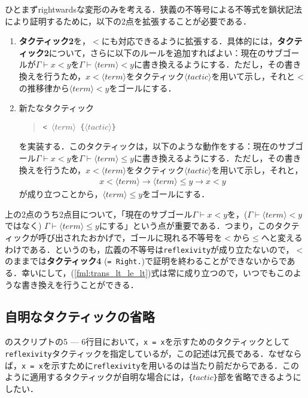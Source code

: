 \documentclass[submit]{ipsj}
\begin{document}
ひとまずrightwardsな変形のみを考える．狭義の不等号による不等式を鎖状記法により証明するために，以下の2点を拡張することが必要である．
\begin{enumerate}
\item {\gtfamily\bfseries タクティック2}を，$<$にも対応できるように拡張する．具体的には，{\gtfamily\bfseries タクティック2}について，さらに以下のルールを追加すればよい：現在のサブゴールが$\varGamma \vdash x < y$を$\varGamma \vdash \langle\mathit{term}\rangle < y$に書き換えるようにする．ただし，その書き換えを行うため，$x < \langle\mathit{term}\rangle$をタクティック$\langle\mathit{tactic}\rangle$を用いて示し，それと$<$の推移律から$\langle\mathit{term}\rangle < y$をゴールにする．
\item\label{item:point2} 新たなタクティック 
\begin{quote}
\quad\verb+< +$\langle\mathit{term}\rangle$\verb+ {+$\langle\mathit{tactic}\rangle$\verb+}+
\end{quote}
を実装する．このタクティックは，以下のような動作をする：現在のサブゴール$\varGamma \vdash x < y$を$\varGamma \vdash \langle\mathit{term}\rangle \leq y$に書き換えるようにする．ただし，その書き換えを行うため，$x < \langle\mathit{term}\rangle$をタクティック$\langle\mathit{tactic}\rangle$を用いて示し，それと，
\begin{eqnarray}
x < \langle\mathit{term}\rangle \to \langle\mathit{term}\rangle \leq y \to x < y \label{fml:trans_lt_le_lt}
\end{eqnarray}
が成り立つことから，$\langle\mathit{term}\rangle \leq y$をゴールにする．
\end{enumerate}
上の2点のうち2点目について，「現在のサブゴール$\varGamma \vdash x < y$を，($\varGamma \vdash \langle\mathit{term}\rangle < y$ではなく) $\varGamma \vdash \langle\mathit{term}\rangle \leq y$にする」という点が重要である．つまり，このタクティックが呼び出されたおかげで，ゴールに現れる不等号を$<$から$\leq$へと変えるわけである．というのも，広義の不等号は\verb~reflexivity~が成り立たないので，$<$のままでは{\bfseries\gtfamily タクティック4} (\verb+= Right.+)で証明を終わることができないからである．幸いにして，(\ref{fml:trans_lt_le_lt})式は常に成り立つので，いつでもこのような書き換えを行うことができる．


\subsection{自明なタクティックの省略}\label{subsec:easy_tactic}

のスクリプトの5 --- 6行目において，\verb+x = x+を示すためのタクティックとして\verb+reflexivity+タクティックを指定しているが，この記述は冗長である．なぜならば，\verb+x = x+を示すために\verb+reflexivity+を用いるのは当たり前だからである．このように適用するタクティックが自明な場合には，\verb+{+$\mathit{tactic}$\verb+}+部を省略できるようにしたい．
\end{document}
